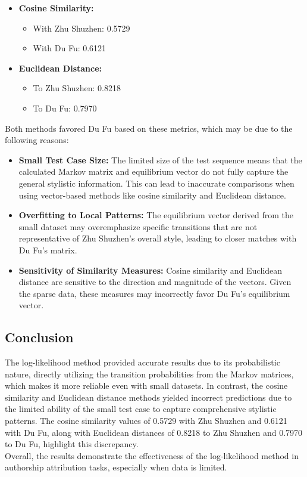\documentclass[12pt]{article}
\begin{document}
\begin{itemize}
    \item \textbf{Cosine Similarity:}
    \begin{itemize}
        \item With Zhu Shuzhen: 0.5729
        \item With Du Fu: 0.6121
    \end{itemize}
    \item \textbf{Euclidean Distance:}
    \begin{itemize}
        \item To Zhu Shuzhen: 0.8218
        \item To Du Fu: 0.7970
    \end{itemize}
\end{itemize}

\noindent Both methods favored Du Fu based on these metrics, which may be due to the following reasons:
\begin{itemize}
    \item \textbf{Small Test Case Size:} The limited size of the test sequence means that the calculated Markov matrix and equilibrium vector do not fully capture the general stylistic information. This can lead to inaccurate comparisons when using vector-based methods like cosine similarity and Euclidean distance.
    \item \textbf{Overfitting to Local Patterns:} The equilibrium vector derived from the small dataset may overemphasize specific transitions that are not representative of Zhu Shuzhen’s overall style, leading to closer matches with Du Fu's matrix.
    \item \textbf{Sensitivity of Similarity Measures:} Cosine similarity and Euclidean distance are sensitive to the direction and magnitude of the vectors. Given the sparse data, these measures may incorrectly favor Du Fu's equilibrium vector.
\end{itemize}

\subsection*{Conclusion}

The log-likelihood method provided accurate results due to its probabilistic nature, directly utilizing the transition probabilities from the Markov matrices, which makes it more reliable even with small datasets. In contrast, the cosine similarity and Euclidean distance methods yielded incorrect predictions due to the limited ability of the small test case to capture comprehensive stylistic patterns. The cosine similarity values of 0.5729 with Zhu Shuzhen and 0.6121 with Du Fu, along with Euclidean distances of 0.8218 to Zhu Shuzhen and 0.7970 to Du Fu, highlight this discrepancy.
\\
Overall, the results demonstrate the effectiveness of the log-likelihood method in authorship attribution tasks, especially when data is limited.
\end{document}
